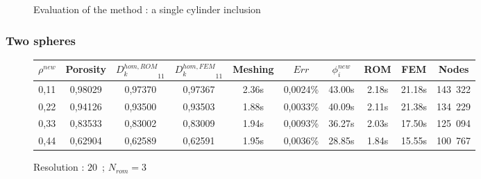 \begin{figure}[H]%
%
\begin{table}[H]
\begin{center}
%
%
\qquad
{}%
%
\end{center}
\end{table}
%
\caption{Evaluation of the method : a single cylinder inclusion}
\end{figure}

\subsubsection{Two spheres}

\begin{figure}[H]%
%
\begin{center}
\begin{tabular}{|c|c||c|c||c|c||c|c||c||c|}
\hline
\rowcolor{lightgray} $\rho^{new}$&Porosity&${D_k^{hom,ROM}}_{11}$&${D_k^{hom,FEM}}_{11}$&Meshing&$Err$&$\phi_i^{new}$&ROM&FEM&Nodes\\
\hline
0,11&0,98029&0,97370&0,97367&2.36s&0,0024\%&43.00s&2.18s&21.18s&143\ 322\\
\hline
0,22&0,94126&0,93500&0,93503&1.88s&0,0033\%&40.09s&2.11s&21.38s&134\ 229\\
\hline
0,33&0,83533&0,83002&0,83009&1.94s&0,0093\%&36.27s&2.03s&17.50s&125\ 094\\
\hline
0,44&0,62904&0,62589&0,62591&1.95s&0,0036\%&28.85s&1.84s&15.55s&100\ 767\\
\hline
\end{tabular}
\end{center}
\caption{Resolution : $20$\ ; $N_{rom}=3$}
%
\end{figure}

